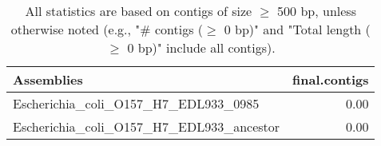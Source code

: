 \documentclass[12pt,a4paper]{article}
\begin{document}
\begin{table}[ht]
\begin{center}
\caption{All statistics are based on contigs of size $\geq$ 500 bp, unless otherwise noted (e.g., "\# contigs ($\geq$ 0 bp)" and "Total length ($\geq$ 0 bp)" include all contigs).}
\begin{tabular}{|l*{1}{|r}|}
\hline
Assemblies & final.contigs \\ \hline
Escherichia\_coli\_O157\_H7\_EDL933\_0985 & 0.00 \\ \hline
Escherichia\_coli\_O157\_H7\_EDL933\_ancestor & 0.00 \\ \hline
\end{tabular}
\end{center}
\end{table}
\end{document}
